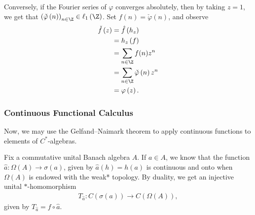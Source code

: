\documentclass[10pt]{mypackage}
\begin{document}
\begin{example}
  Conversely, if the Fourier series of $\varphi$ converges absolutely, then by taking $z = 1$, we get that $\left(\check\varphi\left(n\right)\right)_{n\in\Z}\in\ell_1\left(\Z\right)$. Set $f(n) = \check\varphi\left(n\right)$, and observe
  \begin{align*}
    \check f\left(z\right) &= \hat f\left(h_z\right)\\
                         &= h_z\left(f\right)\\
                         &= \sum_{n\in \Z}f(n)z^n\\
                         &= \sum_{n\in\Z}\check\varphi\left(n\right)z^n\\
                         &= \varphi\left(z\right).
  \end{align*}
\end{example}
\subsubsection{Continuous Functional Calculus}%
Now, we may use the Gelfand--Naimark theorem to apply continuous functions to elements of $C^{\ast}$-algebras.\newline

Fix a commutative unital Banach algebra $A$. If $a\in A$, we know that the function $\hat{a}\colon \Omega\left(A\right)\rightarrow \sigma\left(a\right)$, given by $\hat{a}\left(h\right) = h\left(a\right)$ is continuous and onto when $\Omega\left(A\right)$ is endowed with the weak* topology. By duality, we get an injective unital $\ast$-homomorphism
\begin{align*}
  T_{\hat{a}}\colon C\left(\sigma\left(a\right)\right) \rightarrow C\left(\Omega\left(A\right)\right),
\end{align*}
given by $T_{\hat{a}} = f\circ \hat{a}$.\newline
\end{document}
